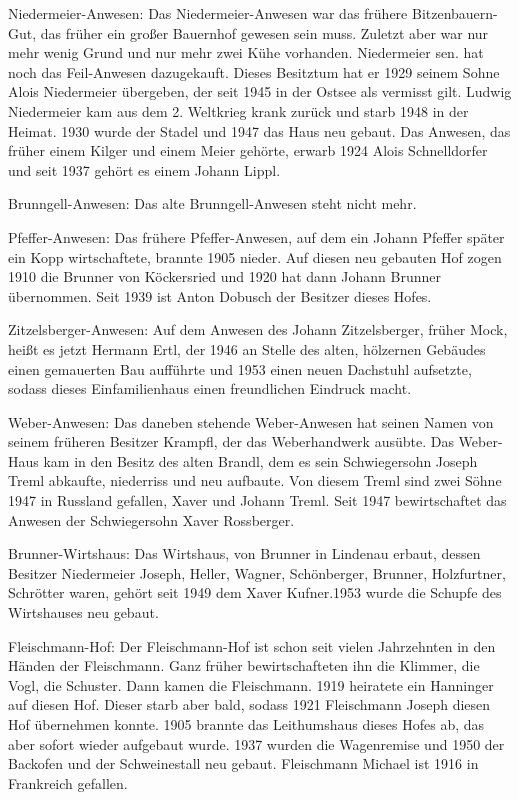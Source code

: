 Niedermeier-Anwesen: Das Niedermeier-Anwesen war das frühere Bitzenbauern-Gut,
das früher ein großer Bauernhof gewesen sein muss. Zuletzt aber war nur mehr
wenig Grund und nur mehr zwei Kühe vorhanden. Niedermeier sen. hat noch das
Feil-Anwesen dazugekauft. Dieses Besitztum hat er 1929 seinem Sohne Alois
Niedermeier übergeben, der seit 1945 in der Ostsee als vermisst gilt. Ludwig
Niedermeier kam aus dem 2. Weltkrieg krank zurück und starb 1948 in der Heimat.
1930 wurde der Stadel und 1947 das Haus neu gebaut. Das Anwesen, das früher
einem Kilger und einem Meier gehörte, erwarb 1924 Alois Schnelldorfer und seit
1937 gehört es einem Johann Lippl.

Brunngell-Anwesen: Das alte Brunngell-Anwesen steht nicht mehr.

Pfeffer-Anwesen: Das frühere Pfeffer-Anwesen, auf dem ein Johann Pfeffer später
ein Kopp wirtschaftete, brannte 1905 nieder. Auf diesen neu gebauten Hof zogen
1910 die Brunner von Köckersried und 1920 hat dann Johann Brunner übernommen.
Seit 1939 ist Anton Dobusch der Besitzer dieses Hofes.

Zitzelsberger-Anwesen: Auf dem Anwesen des Johann Zitzelsberger, früher Mock,
heißt es jetzt Hermann Ertl, der 1946 an Stelle des alten, hölzernen Gebäudes
einen gemauerten Bau aufführte und 1953 einen neuen Dachstuhl aufsetzte, sodass
dieses Einfamilienhaus einen freundlichen Eindruck macht.

Weber-Anwesen: Das daneben stehende Weber-Anwesen hat seinen Namen von seinem
früheren Besitzer Krampfl, der das Weberhandwerk ausübte. Das Weber-Haus kam in
den Besitz des alten Brandl, dem es sein Schwiegersohn Joseph Treml abkaufte,
niederriss und neu aufbaute. Von diesem Treml sind zwei Söhne 1947 in Russland
gefallen, Xaver und Johann Treml. Seit 1947 bewirtschaftet das Anwesen der
Schwiegersohn Xaver Rossberger.

Brunner-Wirtshaus: Das Wirtshaus, von Brunner in Lindenau erbaut, dessen
Besitzer Niedermeier Joseph, Heller, Wagner, Schönberger, Brunner, Holzfurtner,
Schrötter waren, gehört seit 1949 dem Xaver Kufner.1953 wurde die Schupfe des
Wirtshauses neu gebaut.

Fleischmann-Hof: Der Fleischmann-Hof ist schon seit vielen Jahrzehnten in den
Händen der Fleischmann. Ganz früher bewirtschafteten ihn die Klimmer, die Vogl,
die Schuster. Dann kamen die Fleischmann. 1919 heiratete ein Hanninger auf
diesen Hof. Dieser starb aber bald, sodass 1921 Fleischmann Joseph diesen Hof
übernehmen konnte. 1905 brannte das Leithumshaus dieses Hofes ab, das aber
sofort wieder aufgebaut wurde. 1937 wurden die Wagenremise und 1950 der Backofen
und der Schweinestall neu gebaut. Fleischmann Michael ist 1916 in Frankreich
gefallen.

